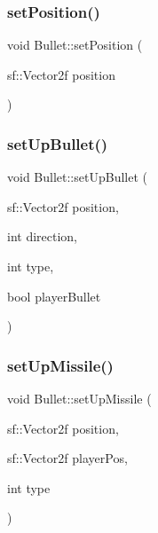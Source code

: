 \hypertarget{class_bullet_a143a06245534960d6af5ffb10b101750}{}\label{class_bullet_a143a06245534960d6af5ffb10b101750} 
\subsubsection{\texorpdfstring{set\+Position()}{setPosition()}}
{\footnotesize\ttfamily void Bullet\+::set\+Position (\begin{DoxyParamCaption}\item[{sf\+::\+Vector2f}]{position }\end{DoxyParamCaption})}

\hypertarget{class_bullet_a94a279bd2d28fa50c0c639915300b52f}{}\label{class_bullet_a94a279bd2d28fa50c0c639915300b52f} 
\subsubsection{\texorpdfstring{set\+Up\+Bullet()}{setUpBullet()}}
{\footnotesize\ttfamily void Bullet\+::set\+Up\+Bullet (\begin{DoxyParamCaption}\item[{sf\+::\+Vector2f}]{position,  }\item[{int}]{direction,  }\item[{int}]{type,  }\item[{bool}]{player\+Bullet }\end{DoxyParamCaption})}

\hypertarget{class_bullet_a5ee57e44e79f829920f4c117937d5f97}{}\label{class_bullet_a5ee57e44e79f829920f4c117937d5f97} 
\subsubsection{\texorpdfstring{set\+Up\+Missile()}{setUpMissile()}}
{\footnotesize\ttfamily void Bullet\+::set\+Up\+Missile (\begin{DoxyParamCaption}\item[{sf\+::\+Vector2f}]{position,  }\item[{sf\+::\+Vector2f}]{player\+Pos,  }\item[{int}]{type }\end{DoxyParamCaption})}

